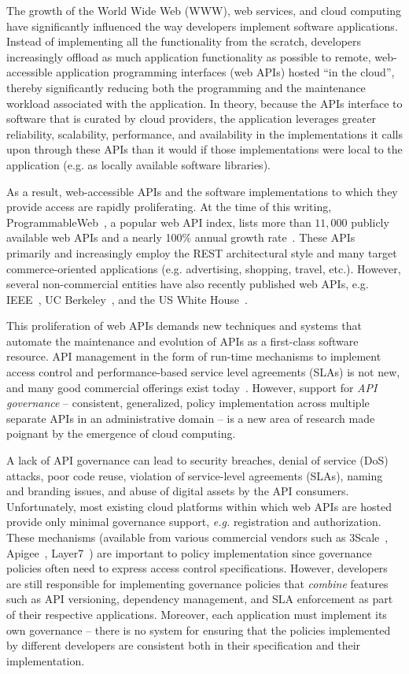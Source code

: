 The growth of the World Wide Web (WWW), web services, and cloud computing have
significantly influenced the way developers implement software applications.
Instead of implementing all the functionality from the scratch, developers
increasingly offload as much application functionality as possible to remote,
web-accessible application programming interfaces (web APIs) hosted ``in the
cloud'', thereby significantly reducing both the programming and
the maintenance workload associated with the application.  In theory, because
the APIs interface to software that is curated by cloud providers, the
application leverages greater
reliability, scalability, performance, 
and availability in the implementations it calls upon through these APIs than
it would if those implementations were local to the application
(e.g. as locally available software libraries).

As a result, web-accessible APIs and the software implementations to which
they provide access are rapidly proliferating.
At the time of this writing, 
ProgrammableWeb~\cite{pweb}, a popular web API index, lists more than $11,000$
publicly available
web APIs and a nearly 100\% annual growth rate~\cite{pweb_growth}. 
These APIs primarily and increasingly employ the REST architectural style and 
many target commerce-oriented applications (e.g.
advertising, shopping, travel, etc.).
However, several non-commercial entities have also recently
published web 
APIs, e.g. IEEE~\cite{ieeeapis}, UC Berkeley~\cite{ucbapis}, and the US White
House~\cite{whitehouseapis}. 

This proliferation of web APIs demands new techniques and systems that
automate the maintenance and evolution of APIs as a first-class software
resource.  API management in the form of run-time mechanisms to implement
access control and performance-based service level agreements (SLAs) is not
new, and many good commercial offerings exist today~\cite{3scale,apigee,layer7}.   
However, support for \textit{API governance} -- consistent, generalized, policy
implementation across multiple separate APIs in an administrative domain --
is a new area of research made poignant by the emergence of cloud computing.

A lack of API governance can lead to 
security breaches, denial of service (DoS)
attacks, poor code reuse, violation of service-level agreements (SLAs), 
naming and branding issues, and abuse of digital 
assets by the API consumers. Unfortunately, most existing cloud platforms
within which web APIs are hosted provide only minimal governance support, {\em
e.g.}
registration and authorization.  These mechanisms
(available from various commercial vendors such as
3Scale~\cite{3scale}, Apigee~\cite{apigee},
Layer7~\cite{layer7})
are important to policy implementation since governance policies often need to
express access control specifications.  
However, developers are still responsible for implementing governance policies
that {\em combine} features such as API versioning, 
dependency management, and SLA enforcement as part of their respective
applications.  Moreover, each application must
implement its own governance -- there is no system for ensuring that the
policies implemented by different developers are consistent both in their
specification and their implementation.

